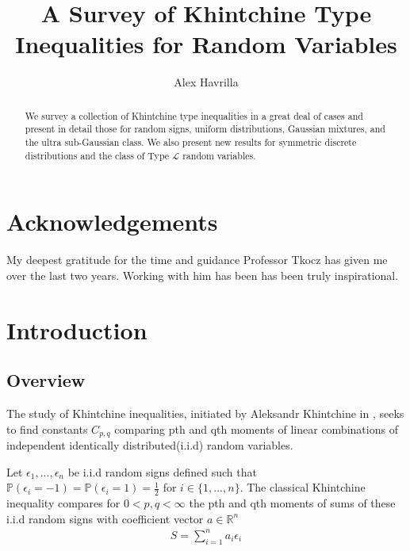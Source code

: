 \documentclass[10pt]{article}
\title{\vspace{-3em}A Survey of Khintchine Type Inequalities for Random Variables}
\author{Alex Havrilla}
\newcommand{\Pp}{\mathbb{P}}
\newcommand{\1}{\textbf{1}}
\newcommand{\R}{\mathbb{R}}
\theoremstyle{remark}
\theoremstyle{definition}
\begin{document}
\maketitle

\begin{abstract}
	We survey a collection of Khintchine type inequalities in a great deal of cases and present in detail those for random signs, uniform distributions, Gaussian mixtures, and the ultra sub-Gaussian class. We also present new results for symmetric discrete distributions and the class of Type $\mathcal{L}$ random variables.
\end{abstract}

\newpage

\section*{Acknowledgements}

My deepest gratitude for the time and guidance Professor Tkocz has given me over the last two
 years. Working with him has been has been truly inspirational.

\newpage

\tableofcontents

\newpage

\section{Introduction} 

\subsection{Overview}

The study of Khintchine inequalities, initiated by Aleksandr Khintchine in \cite{K}, seeks to find constants $C_{p,q}$ comparing pth and qth moments of linear combinations of independent identically distributed(i.i.d) random variables. 

Let $\epsilon_1,...,\epsilon_n$ be i.i.d random signs defined such that $\Pp(\epsilon_i = -1) = \Pp(\epsilon_i = 1) = \frac{1}{2}$ for $i \in \{1,...,n\}$. The classical Khintchine inequality compares for $0 < p,q < \infty$ the pth and qth moments of sums of these i.i.d random signs with coefficient vector $a \in \R^n$
\begin{align*}
	S = \sum_{i=1}^n a_i \epsilon_i
\end{align*} 
\end{document}
